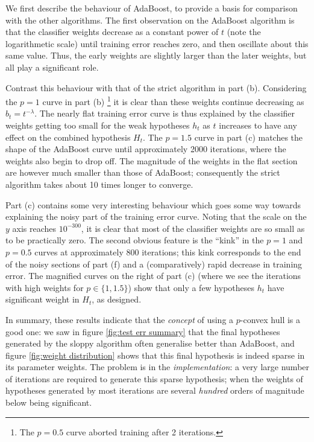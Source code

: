 We first describe the behaviour of AdaBoost, to provide a basis for
comparison with the other algorithms.  The first observation on the
AdaBoost algorithm is that the classifier weights decrease as a
constant power of $t$ (note the logarithmetic scale) until training
error reaches zero, and then oscillate about this same value.  Thus,
the early weights are slightly larger than the later weights, but all
play a significant role.

Contrast this behaviour with that of the strict algorithm in part (b).
Considering the $p=1$ curve in part (b)%
\footnote{The $p=0.5$ curve aborted training after 2 iterations.}
it is clear than these weights continue decreasing as $b_t =
t^{-\lambda}$.  The nearly flat training error curve is thus explained
by the classifier weights getting too small for the weak hypotheses
$h_t$ as $t$ increases to have any effect on the combined hypothesis
$H_t$.  The $p=1.5$ curve in part (c) matches the shape of the
AdaBoost curve until approximately 2000 iterations, where the weights
also begin to drop off.  The magnitude of the weights in the flat
section are however much smaller than those of AdaBoost; consequently
the strict algorithm takes about 10 times longer to converge.

Part (c) contains some very interesting behaviour which goes some way
towards explaining the noisy part of the training error curve.  Noting
that the scale on the $y$ axis reaches $10^{-300}$, it is clear that
most of the classifier weights are so small as to be practically
zero.  The second obvious feature is the ``kink'' in the $p=1$ and
$p=0.5$ curves at approximately 800 iterations; this kink corresponds
to the end of the noisy sections of part (f) and a (comparatively)
rapid decrease in training error.  The magnified curves on the right
of part (c) (where we see the iterations with high weights for $p \in
\{1, 1.5\}$) show that only a few hypotheses $h_t$ have significant
weight in $H_t$, as designed.

In summary, these results indicate that the \emph{concept} of using a
$p$-convex hull is a good one: we saw in figure \ref{fig:test err
summary} that the final hypotheses generated by the sloppy algorithm
often generalise better than AdaBoost, and figure \ref{fig:weight
distribution} shows that this final hypothesis is indeed sparse in
its parameter weights.  The problem is in the \emph{implementation}:
a very large number of iterations are required to generate this sparse
hypothesis; when the weights of hypotheses generated by most
iterations are several \emph{hundred} orders of magnitude below being
significant.

